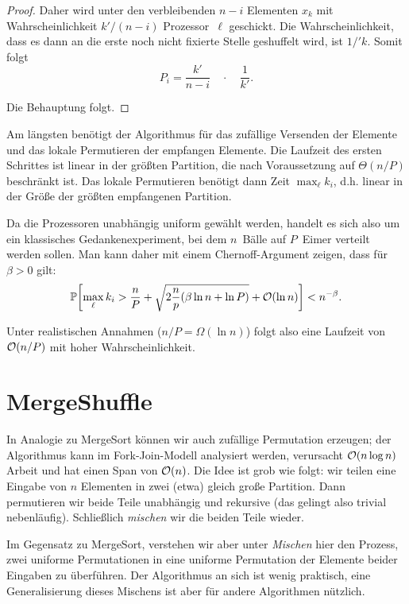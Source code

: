 \begin{proof}
        Daher wird unter den verbleibenden $n-i$ Elementen $x_k$ mit Wahrscheinlichkeit $k' / (n-i)$ Prozessor~$\ell$ geschickt.
        Die Wahrscheinlichkeit, dass es dann an die erste noch nicht fixierte Stelle geshuffelt wird, ist $1 / 'k$.
        Somit folgt
        \begin{equation}
            P_i = \frac{k'}{n - i} \quad \cdot \quad \frac{1}{k'}.
        \end{equation}

        \noindent
        Die Behauptung folgt.
    \end{proof}
\fi

Am längsten benötigt der Algorithmus für das zufällige Versenden der Elemente und das lokale Permutieren der empfangen Elemente.
Die Laufzeit des ersten Schrittes ist linear in der größten Partition, die nach Voraussetzung auf $\Theta(n / P)$ beschränkt ist.
Das lokale Permutieren benötigt dann Zeit $\max_\ell k_i$, d.h. linear in der Größe der größten empfangenen Partition.

Da die Prozessoren unabhängig uniform gewählt werden, handelt es sich also um ein klassisches Gedankenexperiment, bei dem $n$~Bälle auf $P$~Eimer verteilt werden sollen.
Man kann daher mit einem Chernoff-Argument zeigen, dass für $\beta > 0$ gilt:
\begin{equation}
    \mathbb{P}\!\left[\max_\ell k_i > \frac{n}{P} + \sqrt{2 \frac n p (\beta \ln n + \ln P)  } + \mathcal{O}\!\left(\ln n\right)\right] <  n^{-\beta}.
\end{equation}

Unter realistischen Annahmen ($n / P = \Omega(\ln n)$) folgt also eine Laufzeit von $\mathcal{O}\!\left(n / P\right)$ mit hoher Wahrscheinlichkeit.

\iffalse
    \section{MergeShuffle}
    In Analogie zu MergeSort können wir auch zufällige Permutation erzeugen;
    der Algorithmus kann im Fork-Join-Modell analysiert werden, verursacht $\mathcal{O}\!\left(n \log n\right)$ Arbeit und hat einen Span von $\mathcal{O}\!\left(n\right)$.
    Die Idee ist grob wie folgt:
    wir teilen eine Eingabe von $n$ Elementen in zwei (etwa) gleich große Partition.
    Dann permutieren wir beide Teile unabhängig und rekursive (das gelingt also trivial nebenläufig).
    Schließlich \emph{mischen} wir die beiden Teile wieder.

    Im Gegensatz zu MergeSort, verstehen wir aber unter \emph{Mischen} hier den Prozess,
    zwei uniforme Permutationen in eine uniforme Permutation der Elemente beider Eingaben zu überführen.
    Der Algorithmus an sich ist wenig praktisch, eine Generalisierung dieses Mischens ist aber für andere Algorithmen nützlich.

